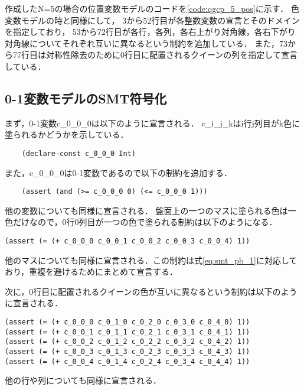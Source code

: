 作成したN=5の場合の位置変数モデルのコードを\ref{code:qgcp_5_pos}に示す．
色変数モデルの時と同様にして，
3から52行目が各整数変数の宣言とそのドメインを指定しており，
53から72行目が各行，各列，各右上がり対角線，各右下がり対角線についてそれぞれ互いに異なるという制約を追加している．
また，73から77行目は対称性除去のために0行目に配置されるクイーンの列を指定して宣言している．




\subsection{0-1変数モデルのSMT符号化}\label{sec:pro_pb}

%
%
まず，0-1変数c\_0\_0\_0は以下のように宣言される．
c\_i\_j\_kはi行j列目がk色に塗られるかどうかを示している．
{ \footnotesize \begin{verbatim}
    (declare-const c_0_0_0 Int)
\end{verbatim}}
また，c\_0\_0\_0は0-1変数であるので以下の制約を追加する．
{ \footnotesize \begin{verbatim}
    (assert (and (>= c_0_0_0 0) (<= c_0_0_0 1)))
\end{verbatim}}
他の変数についても同様に宣言される．
盤面上の一つのマスに塗られる色は一色だけなので，0行0列目が一つの色で塗られる制約は以下のようになる．
{ \footnotesize \begin{verbatim}
(assert (= (+ c_0_0_0 c_0_0_1 c_0_0_2 c_0_0_3 c_0_0_4) 1))
\end{verbatim}}
他のマスについても同様に宣言される．この制約は式\ref{eq:smt_pb_1}に対応しており，重複を避けるためにまとめて宣言する．

次に，0行目に配置されるクイーンの色が互いに異なるという制約は以下のように宣言される．
{ \footnotesize \begin{verbatim}
(assert (= (+ c_0_0_0 c_0_1_0 c_0_2_0 c_0_3_0 c_0_4_0) 1))
(assert (= (+ c_0_0_1 c_0_1_1 c_0_2_1 c_0_3_1 c_0_4_1) 1))
(assert (= (+ c_0_0_2 c_0_1_2 c_0_2_2 c_0_3_2 c_0_4_2) 1))
(assert (= (+ c_0_0_3 c_0_1_3 c_0_2_3 c_0_3_3 c_0_4_3) 1))
(assert (= (+ c_0_0_4 c_0_1_4 c_0_2_4 c_0_3_4 c_0_4_4) 1))
\end{verbatim}}
他の行や列についても同様に宣言される．

